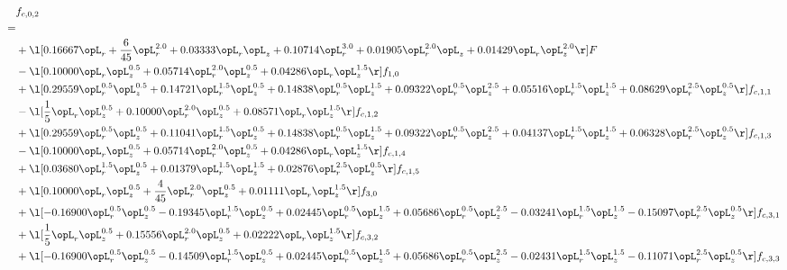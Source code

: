\begin{alignat}{2} 
\label{eq:f_02_1} 
& f_{c,0,2} \nonumber \\ 
 = \\ 
& + \l[  0.16667 \opL_r + \frac{6}{45} \opL_r^{2.0} +  0.03333 \opL_r \opL_z +  0.10714 \opL_r^{3.0} +  0.01905 \opL_r^{2.0} \opL_z +  0.01429 \opL_r \opL_z^{2.0}  \r] F \nonumber \\ 
& - \l[  0.10000 \opL_r \opL_z^{0.5} +  0.05714 \opL_r^{2.0} \opL_z^{0.5} +  0.04286 \opL_r \opL_z^{1.5}  \r] f_{1,0} \nonumber \\ 
& + \l[  0.29559 \opL_r^{0.5} \opL_z^{0.5} +  0.14721 \opL_r^{1.5} \opL_z^{0.5} +  0.14838 \opL_r^{0.5} \opL_z^{1.5} +  0.09322 \opL_r^{0.5} \opL_z^{2.5} +  0.05516 \opL_r^{1.5} \opL_z^{1.5} +  0.08629 \opL_r^{2.5} \opL_z^{0.5}  \r] f_{c,1,1} \nonumber \\ 
& - \l[ \frac{1}{5} \opL_r \opL_z^{0.5} +  0.10000 \opL_r^{2.0} \opL_z^{0.5} +  0.08571 \opL_r \opL_z^{1.5}  \r] f_{c,1,2} \nonumber \\ 
& + \l[  0.29559 \opL_r^{0.5} \opL_z^{0.5} +  0.11041 \opL_r^{1.5} \opL_z^{0.5} +  0.14838 \opL_r^{0.5} \opL_z^{1.5} +  0.09322 \opL_r^{0.5} \opL_z^{2.5} +  0.04137 \opL_r^{1.5} \opL_z^{1.5} +  0.06328 \opL_r^{2.5} \opL_z^{0.5}  \r] f_{c,1,3} \nonumber \\ 
& - \l[  0.10000 \opL_r \opL_z^{0.5} +  0.05714 \opL_r^{2.0} \opL_z^{0.5} +  0.04286 \opL_r \opL_z^{1.5}  \r] f_{c,1,4} \nonumber \\ 
& + \l[  0.03680 \opL_r^{1.5} \opL_z^{0.5} +  0.01379 \opL_r^{1.5} \opL_z^{1.5} +  0.02876 \opL_r^{2.5} \opL_z^{0.5}  \r] f_{c,1,5} \nonumber \\ 
& + \l[  0.10000 \opL_r \opL_z^{0.5} + \frac{4}{45} \opL_r^{2.0} \opL_z^{0.5} +  0.01111 \opL_r \opL_z^{1.5}  \r] f_{3,0} \nonumber \\ 
& + \l[  -0.16900 \opL_r^{0.5} \opL_z^{0.5}   -0.19345 \opL_r^{1.5} \opL_z^{0.5} +  0.02445 \opL_r^{0.5} \opL_z^{1.5} +  0.05686 \opL_r^{0.5} \opL_z^{2.5}   -0.03241 \opL_r^{1.5} \opL_z^{1.5}   -0.15097 \opL_r^{2.5} \opL_z^{0.5}  \r] f_{c,3,1} \nonumber \\ 
& + \l[ \frac{1}{5} \opL_r \opL_z^{0.5} +  0.15556 \opL_r^{2.0} \opL_z^{0.5} +  0.02222 \opL_r \opL_z^{1.5}  \r] f_{c,3,2} \nonumber \\ 
& + \l[  -0.16900 \opL_r^{0.5} \opL_z^{0.5}   -0.14509 \opL_r^{1.5} \opL_z^{0.5} +  0.02445 \opL_r^{0.5} \opL_z^{1.5} +  0.05686 \opL_r^{0.5} \opL_z^{2.5}   -0.02431 \opL_r^{1.5} \opL_z^{1.5}   -0.11071 \opL_r^{2.5} \opL_z^{0.5}  \r] f_{c,3,3} \nonumber \\ 

\end{alignat}
